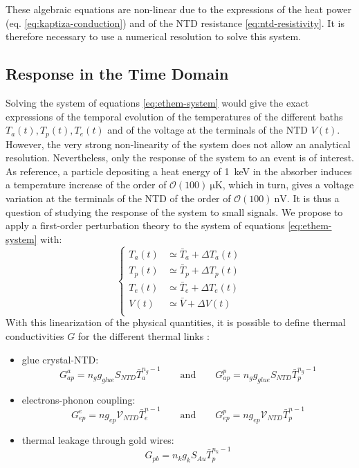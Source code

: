 These algebraic equations are non-linear due to the expressions of the heat power (eq. \ref{eq:kaptiza-conduction}) and of the NTD resistance \ref{eq:ntd-resistivity}. It is therefore necessary to use a numerical resolution to solve this system. 


\subsection{Response in the Time Domain}
\label{par:time-domain}

Solving the system of equations \ref{eq:ethem-system} would give the exact expressions of the temporal evolution of the temperatures of the different baths $T_a(t), T_p(t), T_e(t)$ and of the voltage at the terminals of the NTD $V(t)$.
However, the very strong non-linearity of the system does not allow an analytical resolution.
Nevertheless, only the response of the system to an event is of interest. As reference, a particle depositing a heat energy of \SI{1}{\kilo\eV} in the absorber induces a temperature increase of the order of $\mathcal{O}(100)\ \si{\micro\kelvin}$, which in turn, gives a voltage variation at the terminals of the NTD of the order of $\mathcal{O}(100)\ \si{\nano\volt}$. 
It is thus a question of studying the response of the system to small signals. We propose to apply a first-order perturbation theory \cite{Pyle:2015pya} to the system of equations \ref{eq:ethem-system} with:
\begin{equation}
\label{eq:linearization}
\begin{cases}
T_a(t) &\simeq \bar{T}_a + \Delta T_a (t) \\
T_p(t) &\simeq \bar{T}_p + \Delta T_p (t) \\
T_e(t) &\simeq \bar{T}_e + \Delta T_e (t) \\
V(t) &\simeq \bar{V} + \Delta V (t) \\
\end{cases}
\end{equation}
With this linearization of the physical quantities, it is possible to define thermal conductivities $G$ for the different thermal links :
\begin{itemize}
\item glue crystal-NTD: \begin{equation}\label{eq:g1} G_{ap}^a  = n_g g_{glue} S_{NTD} \bar{T}_a^{n_g-1} \qquad \textrm{and} \qquad G_{ap}^p  = n_g g_{glue} S_{NTD} \bar{T}_p^{n_g-1}
\end{equation}
\item electrons-phonon coupling: \begin{equation}\label{eq:g2} G_{ep}^e  = n g_{ep} \mathcal{V}_{NTD} \bar{T}_e^{n-1} \qquad \textrm{and} \qquad G_{ep}^p  = n g_{ep} \mathcal{V}_{NTD} \bar{T}_p^{n-1}
\end{equation}
\item thermal leakage through gold wires: \begin{equation}\label{eq:g3} G_{pb} = n_k g_{k} S_{Au} \bar{T}_p^{n_k-1}
\end{equation}
\end{itemize}
